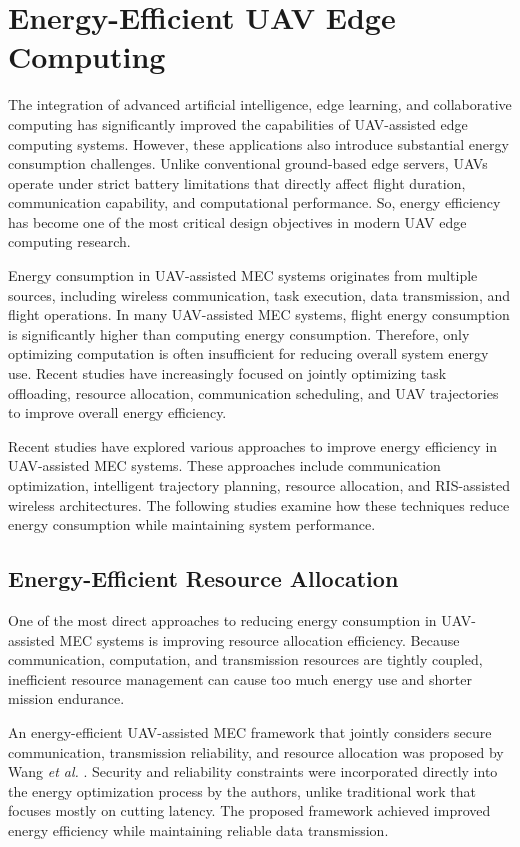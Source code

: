 \documentclass[a4paper, 12pt]{article}
\begin{document}
\section*{Energy-Efficient UAV Edge Computing}
The integration of advanced artificial intelligence, edge learning, and collaborative computing has significantly improved the capabilities of UAV-assisted edge computing systems. However, these applications also introduce substantial energy consumption challenges. Unlike conventional ground-based edge servers, UAVs operate under strict battery limitations that directly affect flight duration, communication capability, and computational performance. So, energy efficiency has become one of the most critical design objectives in modern UAV edge computing research.

Energy consumption in UAV-assisted MEC systems originates from multiple sources, including wireless communication, task execution, data transmission, and flight operations. In many UAV-assisted MEC systems, flight energy consumption is significantly higher than computing energy consumption. Therefore, only optimizing computation is often insufficient for reducing overall system energy use. Recent studies have increasingly focused on jointly optimizing task offloading, resource allocation, communication scheduling, and UAV trajectories to improve overall energy efficiency.

Recent studies have explored various approaches to improve energy efficiency in UAV-assisted MEC systems. These approaches include communication optimization, intelligent trajectory planning, resource allocation, and RIS-assisted wireless architectures. The following studies examine how these techniques reduce energy consumption while maintaining system performance.

\subsection*{Energy-Efficient Resource Allocation}
One of the most direct approaches to reducing energy consumption in UAV-assisted MEC systems is improving resource allocation efficiency. Because communication, computation, and transmission resources are tightly coupled, inefficient resource management can cause too much energy use and shorter mission endurance.

An energy-efficient UAV-assisted MEC framework that jointly considers secure communication, transmission reliability, and resource allocation was proposed by Wang \textit{et al.} \cite{Wang2026Energy}. Security and reliability constraints were incorporated directly into the energy optimization process by the authors, unlike traditional work that focuses mostly on cutting latency. The proposed framework achieved improved energy efficiency while maintaining reliable data transmission.
\end{document}
